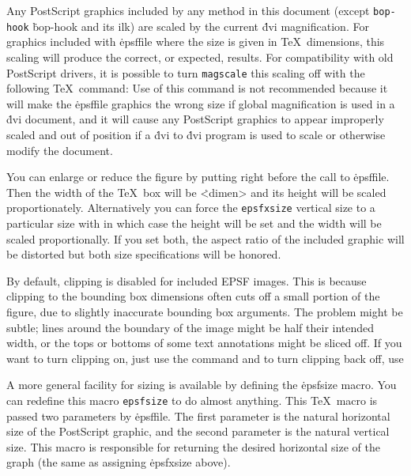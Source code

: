 Any PostScript graphics included by any method in this document (except
\^{{\tt bop-hook}}
\.{bop-hook} and its ilk) are scaled by the current \.{dvi} magnification.
For graphics included with \.{\ttbackslash epsffile} where the size is given
in \TeX\
dimensions, this scaling will produce the correct, or expected, results.
For compatibility with old PostScript drivers, it is possible to turn
\^{{\tt magscale}}
this scaling off with the following \TeX\ command:
\noindent
Use of this command is not recommended because it will make the
\.{\ttbackslash epsffile} graphics the wrong size if global
magnification is used
in a \.{dvi} document, and it will cause any PostScript graphics to
appear improperly scaled and out of position if a \.{dvi} to \.{dvi}
program is used to scale or otherwise modify the document.

You can enlarge or reduce the figure by putting
\noindent
right before the call to \.{\ttbackslash epsffile}.
Then the width of the \TeX\ box will be \.{<dimen>} and its
height will be scaled proportionately.  Alternatively you can force the
\^{{\tt epsfxsize}}
vertical size to a particular size with
\noindent
in which case the height will be set and the width will be scaled
proportionally.  If you set both, the aspect ratio of the included
graphic will be distorted but both size specifications will be
honored.

By default, clipping is disabled for included EPSF images.  This is
because clipping to the bounding box dimensions often cuts off a
small portion of the figure, due to slightly inaccurate bounding
box arguments.  The problem might be subtle; lines around the boundary
of the image might be half their intended width, or the tops or
bottoms of some text annotations might be sliced off.  If you want to
turn clipping on, just use the command
\noindent
and to turn clipping back off, use

A more general facility for sizing is available by defining the
\.{\ttbackslash epsfsize} macro.   You can redefine this macro
\^{{\tt epsfsize}}
to do almost anything.  This \TeX\ macro is passed two parameters
by \.{\ttbackslash epsffile}.  The first parameter is the natural
horizontal size of
the PostScript graphic, and the second parameter is the natural vertical
size.  This macro is responsible for returning the desired horizontal size of
the graph (the same as assigning \.{\ttbackslash epsfxsize} above).

